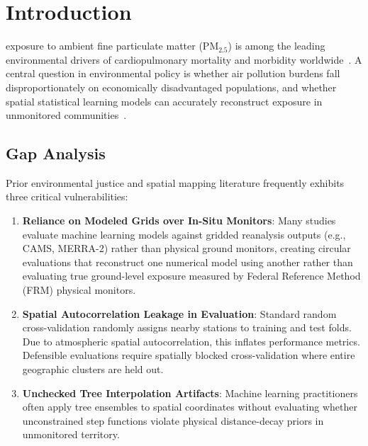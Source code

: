 \documentclass[conference]{IEEEtran}
\begin{document}
\section{Introduction}
 exposure to ambient fine particulate matter ($\mathrm{PM}_{2.5}$) is among the leading environmental drivers of cardiopulmonary mortality and morbidity worldwide~\cite{burnett2018,di2017}. A central question in environmental policy is whether air pollution burdens fall disproportionately on economically disadvantaged populations, and whether spatial statistical learning models can accurately reconstruct exposure in unmonitored communities~\cite{colmer2020,jbaily2022}.

\subsection{Gap Analysis}
\label{sec:gap_analysis}
Prior environmental justice and spatial mapping literature frequently exhibits three critical vulnerabilities:
\begin{enumerate}
    \item \textbf{Reliance on Modeled Grids over In-Situ Monitors}: Many studies evaluate machine learning models against gridded reanalysis outputs (e.g., CAMS, MERRA-2) rather than physical ground monitors, creating circular evaluations that reconstruct one numerical model using another rather than evaluating true ground-level exposure measured by Federal Reference Method (FRM) physical monitors.
    \item \textbf{Spatial Autocorrelation Leakage in Evaluation}: Standard random cross-validation randomly assigns nearby stations to training and test folds. Due to atmospheric spatial autocorrelation, this inflates performance metrics. Defensible evaluations require spatially blocked cross-validation where entire geographic clusters are held out.
    \item \textbf{Unchecked Tree Interpolation Artifacts}: Machine learning practitioners often apply tree ensembles to spatial coordinates without evaluating whether unconstrained step functions violate physical distance-decay priors in unmonitored territory.
\end{enumerate}
\end{document}

